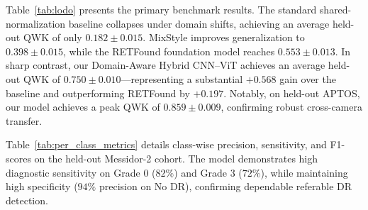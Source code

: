 \documentclass[conference]{IEEEtran}
\begin{document}
Table~\ref{tab:lodo} presents the primary benchmark results. The standard shared-normalization baseline collapses under domain shifts, achieving an average held-out QWK of only $0.182 \pm 0.015$. MixStyle improves generalization to $0.398 \pm 0.015$, while the RETFound foundation model reaches $0.553 \pm 0.013$. In sharp contrast, our Domain-Aware Hybrid CNN--ViT achieves an average held-out QWK of $\mathbf{0.750 \pm 0.010}$---representing a substantial $\mathbf{+0.568}$ gain over the baseline and outperforming RETFound by $+0.197$. Notably, on held-out APTOS, our model achieves a peak QWK of $\mathbf{0.859 \pm 0.009}$, confirming robust cross-camera transfer.

Table~\ref{tab:per_class_metrics} details class-wise precision, sensitivity, and F1-scores on the held-out Messidor-2 cohort. The model demonstrates high diagnostic sensitivity on Grade 0 ($82\%$) and Grade 3 ($72\%$), while maintaining high specificity ($94\%$ precision on No DR), confirming dependable referable DR detection.

\begin{table}[htbp]
    \centering
    \caption{Class-Wise Diagnostic Performance on Held-Out Messidor-2 Cohort (Mean $\pm$ Std Dev across $N=3$ seeds)}
    \label{tab:per_class_metrics}
\end{table}
\end{document}
